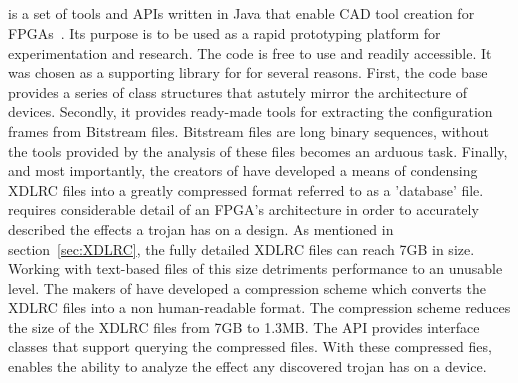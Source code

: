 \subsection{\RapidSmith} \label{sec:rapidSmith}
\RapidSmith is a set of tools and \acrfull{APIs} written in Java that enable \acrfull{CAD} tool creation for \Xilinx \acrshort{FPGA}s~\cite{rapidSmith}.
Its purpose is to be used as a rapid prototyping platform for experimentation and research.
The code is free to use and readily accessible.
It was chosen as a supporting library for \NameNoPeriod for several reasons.
First, the code base provides a series of class structures that astutely mirror the architecture of \Xilinx devices.
Secondly, it provides ready-made tools for extracting the configuration frames from \gls{Bitstream} files. 
\gls{Bitstream} files are long binary sequences, without the tools provided by \RapidSmith the analysis of these files becomes an arduous task.
Finally, and most importantly, the creators of \RapidSmith have developed a means of condensing XDLRC files into a greatly compressed format referred to as a 'database' file.
\NameNoPeriod requires considerable detail of an \acrshort{FPGA}'s architecture in order to accurately described the effects a trojan has on a design.
As mentioned in section~\ref{sec:XDLRC}, the fully detailed XDLRC files can reach 7GB in size.
Working with text-based files of this size detriments performance to an unusable level.
The makers of \RapidSmith have developed a compression scheme which converts the XDLRC files into a non human-readable format.
The compression scheme reduces the size of the XDLRC files from 7GB to 1.3MB. 
The \acrshort{API} provides interface classes that support querying the compressed files.
With these compressed fies, \RapidSmith enables the ability to analyze the effect any discovered trojan has on a device.

